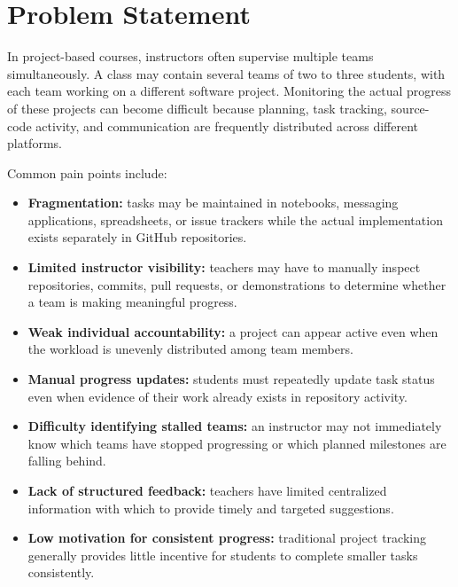 \documentclass[11pt,a4paper]{article}
\begin{document}
\section{Problem Statement}

In project-based courses, instructors often supervise multiple teams simultaneously. A class may contain several teams of two to three students, with each team working on a different software project. Monitoring the actual progress of these projects can become difficult because planning, task tracking, source-code activity, and communication are frequently distributed across different platforms.

Common pain points include:

\begin{itemize}[leftmargin=0.7cm]

    \item \textbf{Fragmentation:} tasks may be maintained in notebooks, messaging applications, spreadsheets, or issue trackers while the actual implementation exists separately in GitHub repositories.

    \item \textbf{Limited instructor visibility:} teachers may have to manually inspect repositories, commits, pull requests, or demonstrations to determine whether a team is making meaningful progress.

    \item \textbf{Weak individual accountability:} a project can appear active even when the workload is unevenly distributed among team members.

    \item \textbf{Manual progress updates:} students must repeatedly update task status even when evidence of their work already exists in repository activity.

    \item \textbf{Difficulty identifying stalled teams:} an instructor may not immediately know which teams have stopped progressing or which planned milestones are falling behind.

    \item \textbf{Lack of structured feedback:} teachers have limited centralized information with which to provide timely and targeted suggestions.

    \item \textbf{Low motivation for consistent progress:} traditional project tracking generally provides little incentive for students to complete smaller tasks consistently.

\end{itemize}
\end{document}
